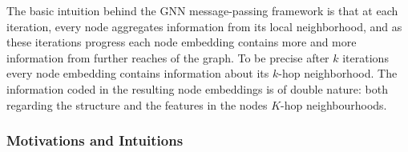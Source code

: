 The basic intuition behind the GNN message-passing framework is that at each iteration, every node aggregates information from its local neighborhood, and as these iterations progress each node embedding contains
more and more information from further reaches of the graph. To be precise after $k$ iterations every node embedding contains information about its $k$-hop neighborhood. 
The information coded in the resulting node embeddings is of double nature: both regarding the structure and the features in the nodes $K$-hop neighbourhoods.


\subsubsection{Motivations and Intuitions}
